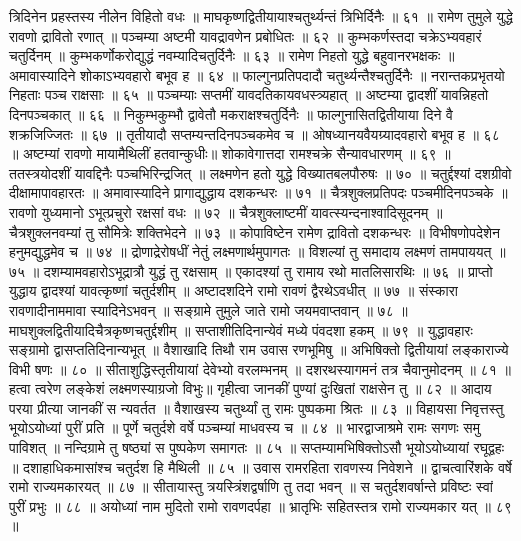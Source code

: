 त्रिदिनेन प्रहस्तस्य नीलेन विहितो वधः ॥
माघकृष्णद्वितीयायाश्चतुर्थ्यन्तं त्रिभिर्दिनैः ॥ ६१ ॥
रामेण तुमुले युद्धे रावणो द्रावितो रणात् ॥
पञ्चम्या अष्टमी यावद्रावणेन प्रबोधितः ॥ ६२ ॥
कुम्भकर्णस्तदा चक्रेऽभ्यवहारं चतुर्दिनम् ॥
कुम्भकर्णोकरोद्युद्धं नवम्यादिचतुर्दिनैः ॥ ६३ ॥
रामेण निहतो युद्धे बहुवानरभक्षकः ॥
अमावास्यादिने शोकाऽभ्यवहारो बभूव ह ॥ ६४ ॥
फाल्गुनप्रतिपदादौ चतुर्थ्यन्तैश्चतुर्दिनैः ॥
नरान्तकप्रभृतयो निहताः पञ्च राक्षसाः ॥ ६५ ॥
पञ्चम्याः सप्तमीं यावदतिकायवधस्त्र्यहात् ॥
अष्टम्या द्वादशीं यावन्निहतो दिनपञ्चकात् ॥ ६६ ॥
निकुम्भकुम्भौ द्वावेतौ मकराक्षश्चतुर्दिनैः ॥
फाल्गुनासितद्वितीयाया दिने वै शक्रजिज्जितः ॥ ६७ ॥
तृतीयादौ सप्तम्यन्तदिनपञ्चकमेव च ॥
ओषध्यानयवैयग्र्यादवहारो बभूव ह ॥ ६८ ॥
अष्टम्यां रावणो मायामैथिलीं हतवान्कुधीः॥
शोकावेगात्तदा रामश्चक्रे सैन्यावधारणम् ॥ ६९ ॥
ततस्त्रयोदशीं यावद्दिनैः पञ्चभिरिन्द्रजित् ॥
लक्ष्मणेन हतो युद्धे विख्यातबलपौरुषः ॥ ७० ॥
चतुर्द्दश्यां दशग्रीवो दीक्षामापावहारतः ॥
अमावास्यादिने प्रागाद्युद्धाय दशकन्धरः ॥ ७१ ॥
चैत्रशुक्लप्रतिपदः पञ्चमीदिनपञ्चके ॥
रावणो युध्यमानो ऽभूत्प्रचुरो रक्षसां वधः ॥ ७२ ॥
चैत्रशुक्लाष्टमीं यावत्स्यन्दनाश्वादिसूदनम् ॥
चैत्रशुक्लनवम्यां तु सौमित्रेः शक्तिभेदने ॥ ७३ ॥
कोपाविष्टेन रामेण द्रावितो दशकन्धरः ॥
विभीषणोपदेशेन हनुमद्युद्धमेव च ॥ ७४ ॥
द्रोणाद्रेरोषधीं नेतुं लक्ष्मणार्थमुपागतः ॥
विशल्यां तु समादाय लक्ष्मणं तामपाययत् ॥ ७५ ॥
दशम्यामवहारोऽभूद्रात्रौ युद्धं तु रक्षसाम् ॥
एकादश्यां तु रामाय रथो मातलिसारथिः ॥ ७६ ॥
प्राप्तो युद्धाय द्वादश्यां यावत्कृष्णां चतुर्दशीम् ॥
अष्टादशदिने रामो रावणं द्वैरथेऽवधीत् ॥ ७७ ॥
संस्कारा रावणादीनाममावा स्यादिनेऽभवन् ॥
सङ्ग्रामे तुमुले जाते रामो जयमवाप्तवान् ॥ ७८ ॥
माघशुक्लद्वितीयादिचैत्रकृष्णचतुर्द्दशीम् ॥
सप्ताशीतिदिनान्येवं मध्ये पंवदशा हकम् ॥ ७९ ॥
युद्धावहारः सङ्ग्रामो द्वासप्ततिदिनान्यभूत् ॥
वैशाखादि तिथौ राम उवास रणभूमिषु ॥
अभिषिक्तो द्वितीयायां लङ्काराज्ये विभी षणः ॥ ८० ॥
सीताशुद्धिस्तृतीयायां देवेभ्यो वरलम्भनम् ॥
दशरथस्यागमनं तत्र चैवानुमोदनम् ॥ ८१ ॥
हत्वा त्वरेण लङ्केशं लक्ष्मणस्याग्रजो विभुः॥
गृहीत्वा जानकीं पुण्यां दुःखितां राक्षसेन तु ॥ ८२ ॥
आदाय परया प्रीत्या जानकीं स न्यवर्तत ॥
वैशाखस्य चतुर्थ्यां तु रामः पुष्पकमा श्रितः ॥ ८३ ॥
विहायसा निवृत्तस्तु भूयोऽयोध्यां पुरीं प्रति ॥
पूर्णे चतुर्दशे वर्षे पञ्चम्यां माधवस्य च ॥ ८४ ॥
भारद्वाजाश्रमे रामः सगणः समु पाविशत् ॥
नन्दिग्रामे तु षष्ठ्यां स पुष्पकेण समागतः ॥ ८५ ॥
सप्तम्यामभिषिक्तोऽसौ भूयोऽयोध्यायां रघूद्वहः ॥
दशाहाधिकमासांश्च चतुर्दश हि मैथिली ॥ ८५ ॥
उवास रामरहिता रावणस्य निवेशने ॥
द्वाचत्वारिंशके वर्षे रामो राज्यमकारयत् ॥ ८७ ॥
सीतायास्तु त्रयस्त्रिंशद्वर्षाणि तु तदा भवन् ॥
स चतुर्दशवर्षान्ते प्रविष्टः स्वां पुरीं प्रभुः ॥ ८८ ॥
अयोध्यां नाम मुदितो रामो रावणदर्पहा ॥
भ्रातृभिः सहितस्तत्र रामो राज्यमकार यत् ॥ ८९ ॥
